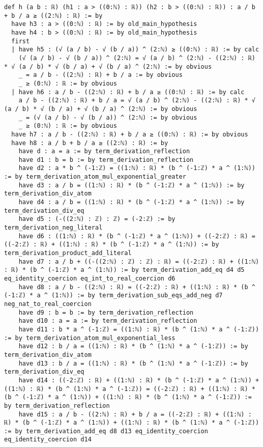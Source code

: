 \documentclass{article}
\begin{document}
\begin{tcolorbox}[colback=white!10, width=\linewidth]
\begin{lstlisting}[language=Lean4]
def h (a b : ℝ) (h1 : a > ((0:ℕ) : ℝ)) (h2 : b > ((0:ℕ) : ℝ)) : a / b + b / a ≥ ((2:ℕ) : ℝ) := by
  have h3 : a > ((0:ℕ) : ℝ) := by old_main_hypothesis
  have h4 : b > ((0:ℕ) : ℝ) := by old_main_hypothesis
  first
  | have h5 : (√ (a / b) - √ (b / a)) ^ (2:ℕ) ≥ ((0:ℕ) : ℝ) := by calc
    (√ (a / b) - √ (b / a)) ^ (2:ℕ) = √ (a / b) ^ (2:ℕ) - ((2:ℕ) : ℝ) * √ (a / b) * √ (b / a) + √ (b / a) ^ (2:ℕ) := by obvious
    _ = a / b - ((2:ℕ) : ℝ) + b / a := by obvious
    _ ≥ (0:ℕ) : ℝ := by obvious
  | have h6 : a / b - ((2:ℕ) : ℝ) + b / a ≥ ((0:ℕ) : ℝ) := by calc
    a / b - ((2:ℕ) : ℝ) + b / a = √ (a / b) ^ (2:ℕ) - ((2:ℕ) : ℝ) * √ (a / b) * √ (b / a) + √ (b / a) ^ (2:ℕ) := by obvious
    _ = (√ (a / b) - √ (b / a)) ^ (2:ℕ) := by obvious
    _ ≥ (0:ℕ) : ℝ := by obvious
  have h7 : a / b - ((2:ℕ) : ℝ) + b / a ≥ ((0:ℕ) : ℝ) := by obvious
  have h8 : a / b + b / a ≥ ((2:ℕ) : ℝ) := by
    have d : a = a := by term_derivation_reflection
    have d1 : b = b := by term_derivation_reflection
    have d2 : a * b ^ (-1:ℤ) = ((1:ℕ) : ℝ) * (b ^ (-1:ℤ) * a ^ (1:ℕ)) := by term_derivation_atom_mul_exponential_greater
    have d3 : a / b = ((1:ℕ) : ℝ) * (b ^ (-1:ℤ) * a ^ (1:ℕ)) := by term_derivation_div_atom
    have d4 : a / b = ((1:ℕ) : ℝ) * (b ^ (-1:ℤ) * a ^ (1:ℕ)) := by term_derivation_div_eq
    have d5 : (-((2:ℕ) : ℤ) : ℤ) = (-2:ℤ) := by term_derivation_neg_literal
    have d6 : ((1:ℕ) : ℝ) * (b ^ (-1:ℤ) * a ^ (1:ℕ)) + ((-2:ℤ) : ℝ) = ((-2:ℤ) : ℝ) + ((1:ℕ) : ℝ) * (b ^ (-1:ℤ) * a ^ (1:ℕ)) := by term_derivation_product_add_literal
    have d7 : a / b + ((-((2:ℕ) : ℤ) : ℤ) : ℝ) = ((-2:ℤ) : ℝ) + ((1:ℕ) : ℝ) * (b ^ (-1:ℤ) * a ^ (1:ℕ)) := by term_derivation_add_eq d4 d5 eq_identity_coercion eq_int_to_real_coercion d6
    have d8 : a / b - ((2:ℕ) : ℝ) = ((-2:ℤ) : ℝ) + ((1:ℕ) : ℝ) * (b ^ (-1:ℤ) * a ^ (1:ℕ)) := by term_derivation_sub_eqs_add_neg d7 neg_nat_to_real_coercion
    have d9 : b = b := by term_derivation_reflection
    have d10 : a = a := by term_derivation_reflection
    have d11 : b * a ^ (-1:ℤ) = ((1:ℕ) : ℝ) * (b ^ (1:ℕ) * a ^ (-1:ℤ)) := by term_derivation_atom_mul_exponential_less
    have d12 : b / a = ((1:ℕ) : ℝ) * (b ^ (1:ℕ) * a ^ (-1:ℤ)) := by term_derivation_div_atom
    have d13 : b / a = ((1:ℕ) : ℝ) * (b ^ (1:ℕ) * a ^ (-1:ℤ)) := by term_derivation_div_eq
    have d14 : ((-2:ℤ) : ℝ) + ((1:ℕ) : ℝ) * (b ^ (-1:ℤ) * a ^ (1:ℕ)) + ((1:ℕ) : ℝ) * (b ^ (1:ℕ) * a ^ (-1:ℤ)) = ((-2:ℤ) : ℝ) + ((1:ℕ) : ℝ) * (b ^ (-1:ℤ) * a ^ (1:ℕ)) + ((1:ℕ) : ℝ) * (b ^ (1:ℕ) * a ^ (-1:ℤ)) := by term_derivation_reflection
    have d15 : a / b - ((2:ℕ) : ℝ) + b / a = ((-2:ℤ) : ℝ) + ((1:ℕ) : ℝ) * (b ^ (-1:ℤ) * a ^ (1:ℕ)) + ((1:ℕ) : ℝ) * (b ^ (1:ℕ) * a ^ (-1:ℤ)) := by term_derivation_add_eq d8 d13 eq_identity_coercion eq_identity_coercion d14

\end{lstlisting}
\end{tcolorbox}
\end{document}
